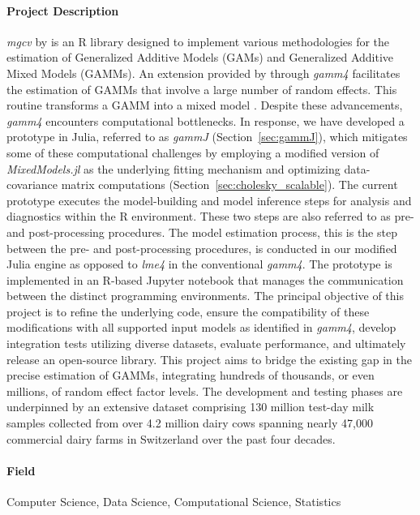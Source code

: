 \paragraph{Project Description} \textit{mgcv} by \cite{wood_generalized_2017} is an R library designed to implement various methodologies for the estimation of Generalized Additive Models (GAMs) and Generalized Additive Mixed Models (GAMMs). An extension provided by \cite{wood_gamm4_2020} through \textit{gamm4} facilitates the estimation of GAMMs that involve a large number of random effects. This routine transforms a GAMM into a mixed model \citep{wood_stable_2004}. Despite these advancements, \textit{gamm4} encounters computational bottlenecks. In response, we have developed a prototype in Julia, referred to as \textit{gammJ} (Section~\ref{sec:gammJ}), which mitigates some of these computational challenges by employing a modified version of \textit{MixedModels.jl} as the underlying fitting mechanism and optimizing data-covariance matrix computations (Section~\ref{sec:cholesky_scalable}). The current prototype executes the model-building and model inference steps for analysis and diagnostics within the R environment. These two steps are also referred to as pre- and post-processing procedures. The model estimation process, this is the step between the pre- and post-processing procedures, is conducted in our modified Julia engine as opposed to \textit{lme4} in the conventional \textit{gamm4}. The prototype is implemented in an R-based Jupyter notebook that manages the communication between the distinct programming environments. The principal objective of this project is to refine the underlying code, ensure the compatibility of these modifications with all supported input models as identified in \textit{gamm4}, develop integration tests utilizing diverse datasets, evaluate performance, and ultimately release an open-source library. This project aims to bridge the existing gap in the precise estimation of GAMMs, integrating hundreds of thousands, or even millions, of random effect factor levels. The development and testing phases are underpinned by an extensive dataset comprising 130 million test-day milk samples collected from over 4.2 million dairy cows spanning nearly 47,000 commercial dairy farms in Switzerland over the past four decades.

\paragraph{Field} Computer Science, Data Science, Computational Science, Statistics

